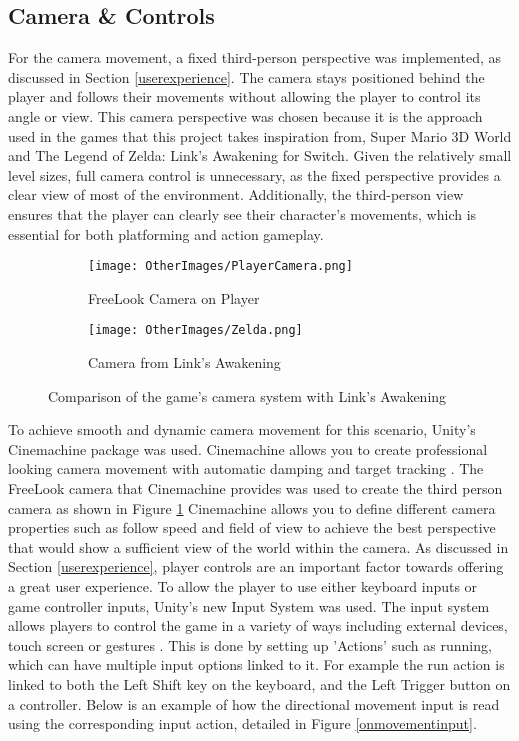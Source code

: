 \documentclass[10pt]{final_report}
\begin{document}
\subsection{Camera \& Controls}
For the camera movement, a fixed third-person perspective was implemented, as discussed in Section \ref{userexperience}.  The camera stays positioned behind the player and follows their movements without allowing the player to control its angle or view. 
This camera perspective was chosen because it is the approach used in the games that this project takes inspiration from, Super Mario 3D World and The Legend of Zelda: Link’s Awakening for Switch. Given the relatively small level sizes, full camera control is unnecessary, as the fixed perspective provides a clear view of most of the environment. Additionally, the third-person view ensures that the player can clearly see their character’s movements, which is essential for both platforming and action gameplay.
\begin{figure}[H]
    \centering
    \begin{subfigure}{0.48\textwidth}
        \centering
        \texttt{[image: OtherImages/PlayerCamera.png]}
        \caption{FreeLook Camera on Player}
        \label{fig:label_camera}
    \end{subfigure}
    \hfill
    \begin{subfigure}{0.48\textwidth}
        \centering
        \texttt{[image: OtherImages/Zelda.png]}
        \caption{Camera from Link's Awakening}
        \label{fig:label_linkcamera}
    \end{subfigure}
    \caption{Comparison of the game's camera system with Link's Awakening}
\end{figure}

To achieve smooth and dynamic camera movement for this scenario, Unity's Cinemachine package was used. Cinemachine allows you to create professional looking camera movement with automatic damping and target tracking \cite{onewheelstudio_2021}. The FreeLook camera that Cinemachine provides was used to create the third person camera as shown in Figure \ref{fig:label_camera}
Cinemachine allows you to define different camera properties such as follow speed and field of view to achieve the best perspective that would show a sufficient view of the world within the camera. \newline
As discussed in Section \ref{userexperience}, player controls are an important factor towards offering a great user experience. To allow the player to use either keyboard inputs or game controller inputs, Unity's new Input System was used. The input system allows players to control the game in a variety of ways including external devices, touch screen or gestures \cite{unity_2024_inputsystem}. This is done by setting up 'Actions' such as running, which can have multiple input options linked to it. For example the run action is linked to both the Left Shift key on the keyboard, and the Left Trigger button on a controller. Below is an example of how the directional movement input is read using the corresponding input action, detailed in Figure \ref{onmovementinput}.
\end{document}
